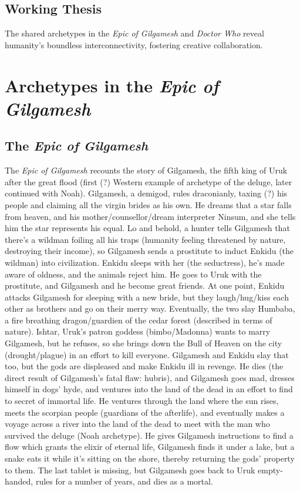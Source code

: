 \documentclass[10pt,a4paper]{article}
\begin{document}



\subsection{Working Thesis}
The shared archetypes in the \emph{Epic of Gilgamesh} and \emph{Doctor Who} reveal humanity’s boundless interconnectivity, fostering  creative collaboration.
   
\section{Archetypes in the \emph{Epic of Gilgamesh}}
\subsection{The \emph{Epic of Gilgamesh}}
The \emph{Epic of Gilgamesh} recounts the story of Gilgamesh, the fifth king of Uruk after the great flood (first (?) Western example of archetype of the deluge, later continued with Noah). Gilgamesh, a demigod, rules draconianly, taxing (?) his people and claiming all the virgin brides as his own. He dreams that a star falls from heaven, and his mother/counsellor/dream interpreter Ninsum, and she tells him the star represents his equal. Lo and behold, a hunter tells Gilgamesh that there's a wildman foiling all his traps (humanity feeling threatened by nature, destroying their income), so Gilgamesh sends a prostitute to induct Enkidu (the wildman) into civilization. Enkidu sleeps with her (the seductress), he's made aware of oldness, and the animals reject him. He goes to Uruk with the prostitute, and Gilgamesh and he become great friends. At one point, Enkidu attacks Gilgamesh for sleeping with a new bride, but they laugh/hug/kiss each other as brothers and go on their merry way. Eventually, the two slay Humbaba, a fire breathing dragon/guardien of the cedar forest (described in terms of nature). Ishtar, Uruk's patron goddess (bimbo/Madonna) wants to marry Gilgamesh, but he refuses, so she brings down the Bull of Heaven on the city (drought/plague) in an effort to kill everyone. Gilgamesh and Enkidu slay that too, but the gods are displeased and make Enkidu ill in revenge. He dies (the direct result of Gilgamesh's fatal flaw: hubris), and Gilgamesh goes mad, dresses himself in dogs' hyde, and ventures into the land of the dead in an effort to find to secret of immortal life. He ventures through the land where the sun rises, meets the scorpian people (guardians of the afterlife), and eventually makes a voyage across a river into the land of the dead to meet with the man who survived the deluge (Noah archetype). He gives Gilgamesh instructions to find a flow which grants the elixir of eternal life, Gilgamesh finds it under a lake, but a snake eats it while it's sitting on the shore, thereby returning the gods' property to them. The last tablet is missing, but Gilgamesh goes back to Uruk empty-handed, rules for a number of years, and dies as a mortal.
\end{document}
